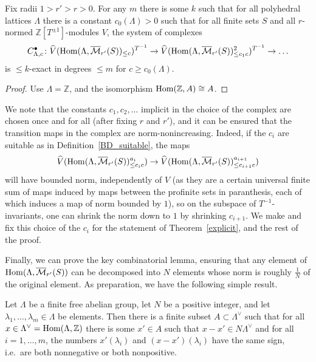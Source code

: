\begin{theorem}
  \label{explicit}
  Fix radii $1>r'>r>0$. For any $m$ there is some $k$
  such that for all polyhedral lattices $\Lambda$
  there is a constant $c_0(\Lambda)>0$
  such that for all finite sets $S$
  and all $r$-normed $\mathbb Z[T^{\pm 1}]$-modules $V$,
  the system of complexes
  \[
  C_{\Lambda,c}^\bullet \colon
  \widehat{V}(\operatorname{Hom}(\Lambda,\overline{\mathcal M}_{r'}(S))_{\leq c})^{T^{-1}} \to
  \widehat{V}(\operatorname{Hom}(\Lambda,\overline{\mathcal M}_{r'}(S))_{\leq c_1c}^2)^{T^{-1}} \to \ldots
  \]
  is $\leq k$-exact in degrees $\leq m$ for $c\geq c_0(\Lambda)$.
\end{theorem}

\begin{proof}
  Use $\Lambda = \mathbb Z$, and the isomorphism $\operatorname{Hom}(\mathbb Z, A) \cong A$.
\end{proof}

We note that the constants $c_1,c_2,\ldots$ implicit in the choice of the complex
are chosen once and for all (after fixing $r$ and $r'$),
and it can be ensured that the transition maps in the complex are norm-nonincreasing.
Indeed, if the $c_i$ are suitable as in Definition~\ref{BD_suitable},
the maps
\[
\widehat{V}(\operatorname{Hom}(\Lambda,\overline{\mathcal M}_{r'}(S))_{\leq c_ic}^{a_i})\to \widehat{V}(\operatorname{Hom}(\Lambda,\overline{\mathcal M}_{r'}(S))_{\leq c_{i+1}c}^{a_{i+1}})
\]
will have bounded norm, independently of $V$ (as they are a certain universal finite sum of maps induced by maps between the profinite sets in paranthesis, each of which induces a map of norm bounded by $1$), so on the subspace of $T^{-1}$-invariants, one can shrink the norm down to $1$ by shrinking $c_{i+1}$. We make and fix this choice of the $c_i$ for the statement of Theorem~\ref{explicit}, and the rest of the proof.


Finally, we can prove the key combinatorial lemma,
ensuring that any element of $\operatorname{Hom}(\Lambda,\overline{\mathcal M}_{r'}(S))$
can be decomposed into $N$ elements whose norm is roughly $\tfrac 1N$ of the original element.
As preparation, we have the following simple result.

\begin{lemma}
  \label{combi_aux}
  \leanok
  Let $\Lambda$ be a finite free abelian group,
  let $N$ be a positive integer,
  and let $\lambda_1,\ldots,\lambda_m\in \Lambda$ be elements.
  Then there is a finite subset $A\subset \Lambda^\vee$
  such that for all $x\in \Lambda^\vee=\operatorname{Hom}(\Lambda,\mathbb Z)$
  there is some $x'\in A$ such that $x-x'\in N\Lambda^\vee$
  and for all $i=1,\ldots,m$,
  the numbers $x'(\lambda_i)$ and $(x-x')(\lambda_i)$ have the same sign,
  i.e.~are both nonnegative or both nonpositive.
\end{lemma}

